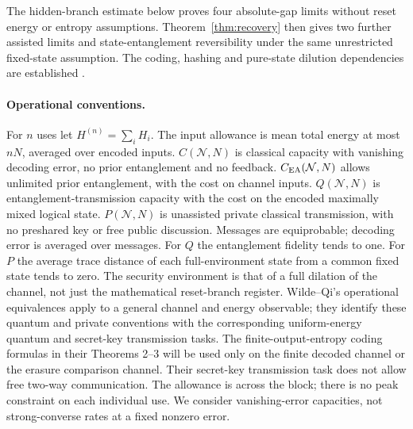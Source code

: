 \documentclass[11pt]{article}
\begin{document}
The hidden-branch estimate below proves four absolute-gap limits
without reset energy or entropy assumptions. Theorem~\ref{thm:recovery}
then gives two further assisted limits and state-entanglement
reversibility under the same unrestricted fixed-state assumption.
The coding, hashing and pure-state dilution dependencies are established
\cite{holevo,hs,wq,dw,dsw,bbps}.

\paragraph{Operational conventions.}
For $n$ uses let $H^{(n)}=\sum_i H_i$. The input allowance is mean
total energy at most $nN$, averaged over encoded inputs.
$C(\mathcal N,N)$ is classical capacity with vanishing decoding error,
no prior entanglement and no feedback.
$C_{\rm EA}(\mathcal N,N)$ allows unlimited prior entanglement,
with the cost on channel inputs.
$Q(\mathcal N,N)$ is entanglement-transmission capacity with the cost
on the encoded maximally mixed logical state.
$P(\mathcal N,N)$ is unassisted private classical transmission, with
no preshared key or free public discussion.
Messages are equiprobable; decoding error is averaged over messages.
For $Q$ the entanglement fidelity tends to one. For $P$ the average
trace distance of each full-environment state from a common fixed state
tends to zero. The security environment is that of a full dilation of
the channel, not just the mathematical reset-branch register.
Wilde--Qi's operational equivalences \cite[Theorem 1]{wq}
apply to a general channel and energy observable; they identify these
quantum and private conventions with the corresponding uniform-energy
quantum and secret-key transmission tasks. The finite-output-entropy
coding formulas in their Theorems 2--3 will be used only on the finite
decoded channel or the erasure comparison channel.
Their secret-key transmission task does not allow free two-way communication.
The allowance is across the block; there is no peak constraint on each
individual use. We consider vanishing-error capacities, not
strong-converse rates at a fixed nonzero error.
\end{document}
